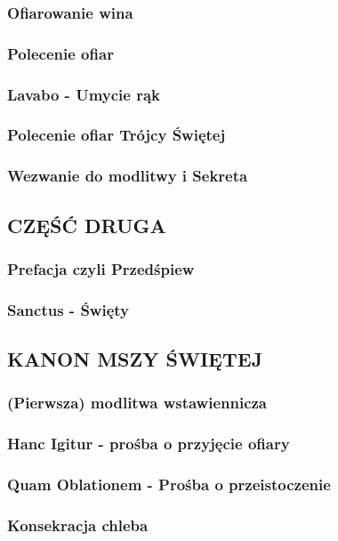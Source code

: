 \documentclass[10pt,titlepage]{article}
\begin{document}
	\subsubsection{Ofiarowanie wina}
	\subsubsection{Polecenie ofiar}
	\subsubsection{Lavabo - Umycie rąk}
	\subsubsection{Polecenie ofiar Trójcy Świętej}
	\subsubsection{Wezwanie do modlitwy i Sekreta}
	
	\subsection{CZĘŚĆ DRUGA}
	
	\subsubsection{Prefacja czyli Przedśpiew}
	\subsubsection{Sanctus - Święty}
	
	\subsection{KANON MSZY ŚWIĘTEJ}
	
	\subsubsection{(Pierwsza) modlitwa wstawiennicza}
	\subsubsection{Hanc Igitur - prośba o przyjęcie ofiary}
	\subsubsection{Quam Oblationem - Prośba o przeistoczenie}
	\subsubsection{Konsekracja chleba}
\end{document}
